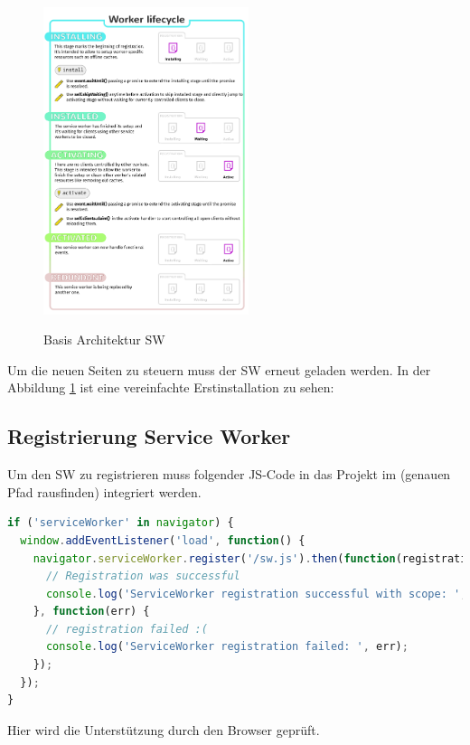 \begin{figure}[h]
	\centering
	\includegraphics[width=6cm]{BilderAllgemein/swLifecycle}\medskip
	\caption{Basis Architektur \acl{SW}}
	\label{fig:Erstinstallation}\cite{ServiceWorkerArchitecture}
\end{figure}


Um die neuen Seiten zu steuern muss der \acs{SW} erneut geladen werden.
In der Abbildung \ref{fig:Erstinstallation} ist eine vereinfachte Erstinstallation zu sehen:

\newpage
\subsection{Registrierung Service Worker}\label{chap:RegistrierungServiceWorker}

Um den \acs{SW} zu registrieren muss folgender \acs{JS}-Code in das Projekt im (genauen Pfad rausfinden) integriert werden.
\begin{lstlisting}[language=JavaScript, caption={Service Worker Register},label=lst:ServiceWorkerRegister, xleftmargin=50pt]
if ('serviceWorker' in navigator) {
  window.addEventListener('load', function() {
    navigator.serviceWorker.register('/sw.js').then(function(registration) {
      // Registration was successful
      console.log('ServiceWorker registration successful with scope: ', registration.scope);
    }, function(err) {
      // registration failed :(
      console.log('ServiceWorker registration failed: ', err);
    });
  });
}
\end{lstlisting}

Hier wird die Unterstützung durch den Browser geprüft.


